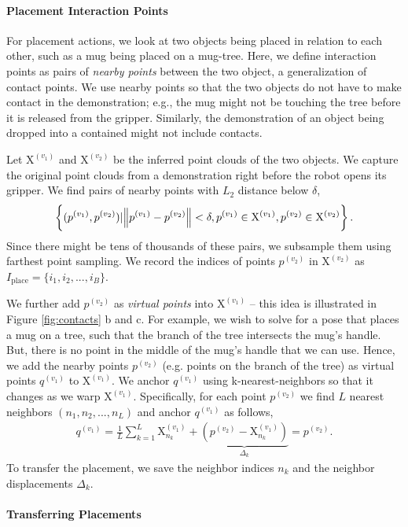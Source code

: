 \documentclass{article}
\newcommand{\pcx}[1]{\mathrm{X}^{(#1)}}
\begin{document}
\paragraph{Placement Interaction Points} For placement actions, we look at two objects being placed in relation to each other, such as a mug being placed on a mug-tree. Here, we define interaction points as pairs of \textit{nearby points} between the two object, a generalization of contact points. We use nearby points so that the two objects do not have to make contact in the demonstration; e.g., the mug might not be touching the tree before it is released from the gripper. Similarly, the demonstration of an object being dropped into a contained might not include contacts.

Let $\pcx{v_1}$ and $\pcx{v_2}$ be the inferred point clouds of the two objects. We capture the original point clouds from a demonstration right before the robot opens its gripper. We find pairs of nearby points with $L_2$ distance below $\delta$,
\begin{align}
    \left\{ (p^{(v_1)}, p^{(v_2)}) | \norm{p^{(v_1)} - p^{(v_2)}} < \delta, p^{(v_1)} \in \pcx{v_1}, p^{(v_2)} \in \pcx{v_2} \right\}.
\end{align}
Since there might be tens of thousands of these pairs, we subsample them using farthest point sampling. We record the indices of points $p^{(v_2)}$ in $\pcx{v_2}$ as $I_{\mathrm{place}} = \{ i_1, i_2, ..., i_B \}$.

We further add $p^{(v_2)}$ as \textit{virtual points} into $\pcx{v_1}$ -- this idea is illustrated in Figure \ref{fig:contacts} b and c. For example, we wish to solve for a pose that places a mug on a tree, such that the branch of the tree intersects the mug's handle. But, there is no point in the middle of the mug's handle that we can use. Hence, we add the nearby points $p^{(v_2)}$ (e.g. points on the branch of the tree) as virtual points $q^{(v_1)}$ to $\pcx{v_1}$. We anchor $q^{(v_1)}$ using k-nearest-neighbors so that it changes as we warp $\pcx{v_1}$. Specifically, for each point $p^{(v_2)}$ we find $L$ nearest neighbors $(n_1, n_2, ..., n_L)$ and anchor $q^{(v_1)}$ as follows,
\begin{align}
    q^{(v_1)} = \frac{1}{L} \sum_{k=1}^L \pcx{v_1}_{n_k} + \underbrace{(p^{(v_2)} - \pcx{v_1}_{n_k})}_{\Delta_k} = p^{(v_2)}.
\end{align}
To transfer the placement, we save the neighbor indices $n_k$ and the neighbor displacements $\Delta_k$.

\paragraph{Transferring Placements} 
\end{document}
